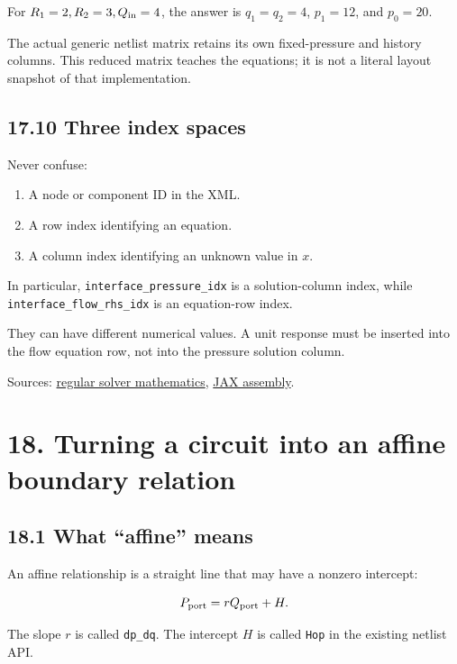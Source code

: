 \documentclass[11pt,a4paper]{article}
\begin{document}
For \(R_1=2,R_2=3,Q_{\rm in}=4\), the answer is \(q_1=q_2=4\), \(p_1=12\), and \(p_0=20\).

The actual generic netlist matrix retains its own fixed-pressure and history columns. This reduced matrix teaches the equations; it is not a literal layout snapshot of that implementation.

\subsection{17.10 Three index spaces}
Never confuse:


\begin{enumerate}
\item A node or component ID in the XML.


\item A row index identifying an equation.


\item A column index identifying an unknown value in \(x\).


\end{enumerate}
In particular, \texttt{interface\_\allowbreak{}pressure\_\allowbreak{}idx} is a solution-column index, while \texttt{interface\_\allowbreak{}flow\_\allowbreak{}rhs\_\allowbreak{}idx} is an equation-row index.

They can have different numerical values. A unit response must be inserted into the flow equation row, not into the pressure solution column.

Sources: \href{/home/sadid/crimson/cfs_reg/CRIMSONFlowsolver/flowsolver/netlist_py/docs/NETLIST_SOLVER_DEVELOPER_GUIDE.md}{regular solver mathematics}, \href{/home/sadid/crimson/cfs_reg/CRIMSONFlowsolver/flowsolver/netlist_py/src/NetlistCircuit_jax.py}{JAX assembly}.

\clearpage
\section{18. Turning a circuit into an affine boundary relation}
\subsection{18.1 What \textquotedblleft{}affine\textquotedblright{} means}
An affine relationship is a straight line that may have a nonzero intercept:


\begingroup\small
\[
P_{\rm port}=rQ_{\rm port}+H.
\]
\endgroup


The slope \(r\) is called \texttt{dp\_\allowbreak{}dq}. The intercept \(H\) is called \texttt{Hop} in the existing netlist API.
\end{document}
